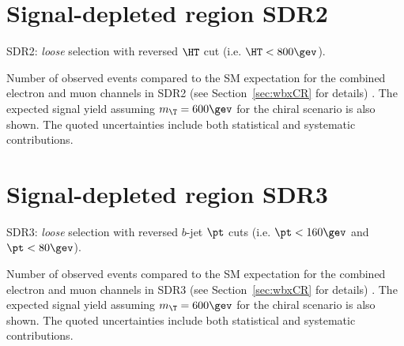 \clearpage

%


\clearpage

\section{Signal-depleted region SDR2}
\label{sec:DataMC_CR1}

SDR2: {\sl loose} selection with reversed $\HT$ cut (i.e. $\HT<800\gev$).

\begin{table}[h!]
\begin{center}

\caption{\small{Number of observed events compared to the SM expectation for
the combined electron and muon channels in SDR2 (see Section~\ref{sec:wbxCR} for details) . 
The expected signal yield assuming $m_{\T}=600\gev$ for the chiral scenario is also shown. 
The quoted uncertainties include both statistical and systematic contributions.}}
\label{tab:CR1_1W_evtable}
\end{center}
\end{table}

\clearpage

%


\clearpage

\section{Signal-depleted region SDR3}
\label{sec:DataMC_CR2}

SDR3: {\sl loose} selection with reversed $b$-jet $\pt$ cuts (i.e. $\pt < 160\gev$ and $\pt < 80\gev$).

\begin{table}[h!]
\begin{center}

\caption{\small{Number of observed events compared to the SM expectation for
the combined electron and muon channels in SDR3 (see Section~\ref{sec:wbxCR} for details) . 
The expected signal yield assuming $m_{\T}=600\gev$ for the chiral scenario is also shown. 
The quoted uncertainties include both statistical and systematic contributions.}}
\label{tab:CR2_1W_evtable}
\end{center}
\end{table}

